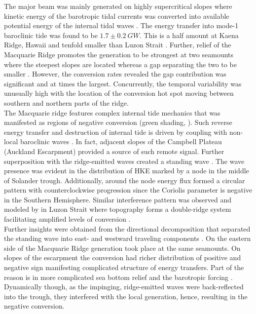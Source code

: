 \documentclass[12pt]{article}
\begin{document}
The major beam was mainly generated on highly supercritical slopes where kinetic energy of the 
barotropic tidal currents was converted into available potential energy of the internal tidal 
waves . The energy transfer into mode-1 baroclinic tide was found to be $1.7 
\pm 0.2~GW$. 
This is a half amount at Kaena Ridge, Hawaii \citep{carter2008energetics} and tenfold smaller than 
Luzon Strait \citep{alford2011energy, kerry2014impact}. Further, relief of 
the Macquarie 
Ridge 
promotes the generation to be strongest at two seamounts where the steepest slopes are located  
whereas a gap separating the two to be smaller . However, 
the conversion rates  revealed the gap contribution was significant and 
at times the largest. Concurrently, the temporal variability was unusually high with the location 
of the conversion hot spot moving between southern and northern parts of the ridge.\\

The Macquarie ridge features complex internal tide mechanics that was manifested as 
regions of negative conversion (green shading, ). Such reverse energy 
transfer and destruction of internal tide is driven by coupling with non-local baroclinic waves 
\citep{Kelly2010a}. In fact, adjacent slopes of the Campbell Plateau (Auckland Escarpment) provided 
a source of such remote signal. Further superposition with the 
ridge-emitted waves created a standing wave . The wave presence was 
evident in the distribution of HKE marked by a node in the middle of Solander trough. Additionally, 
around the node energy flux formed a circular pattern  with 
counterclockwise progression since the Coriolis parameter is negative in the Southern Hemisphere. 
Similar interference pattern was observed and modeled by \citep{buijsman2014three} in Luzon 
Strait where topography forms a double-ridge system facilitating amplified levels of conversion 
\citep{buijsman2012double, klymak2013parameterizing}.\\

Further insights were obtained from the directional decomposition that separated the 
standing wave into east- and westward traveling components . On 
the eastern side of the Macquarie Ridge generation took 
place at the same seamounts. On slopes of the escarpment the conversion had richer 
distribution of positive and negative sign manifesting complicated structure of energy transfers. 
Part of the reason is in more complicated sea bottom relief and the barotropic forcing 
. Dynamically though, as the impinging, ridge-emitted waves were 
back-reflected into the trough, they interfered with the local generation, hence, resulting in the 
negative conversion.\\
\end{document}
